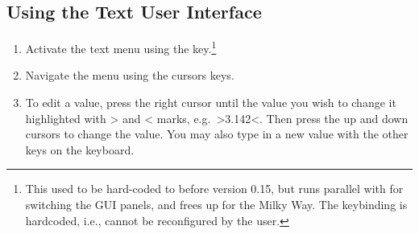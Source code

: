 \subsection{Using the Text User Interface}
\label{sec:plugins:TUI:using}

\begin{enumerate}
\item Activate the text menu using the  key.\footnote{This
    used to be hard-coded to  before version 0.15, but
     runs parallel with  for switching the GUI
    panels, and frees up  for the Milky Way. The 
    keybinding is hardcoded, i.e., cannot be reconfigured by the
    user.}
\item
  Navigate the menu using the cursors keys.
\item
  To edit a value, press the right cursor until the value you wish to
  change it highlighted with \textgreater{} and \textless{} marks, e.g.\
  \textgreater{}3.142\textless{}. Then press the up and down cursors to
  change the value. You may also type in a new value with the other keys
  on the keyboard.
\end{enumerate}


